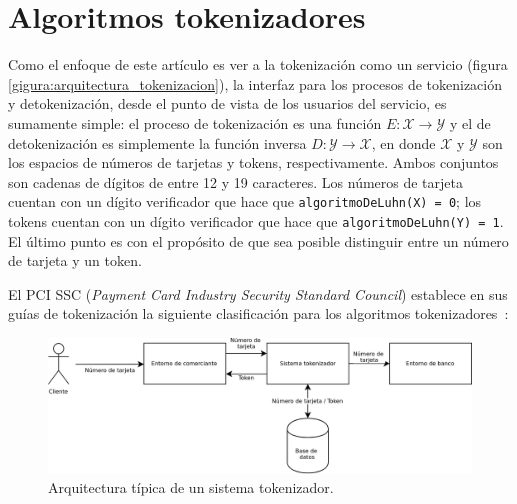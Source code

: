 %
%

\section{Algoritmos tokenizadores}

Como el enfoque de este artículo es ver a la tokenización como un servicio
(figura \ref{gigura:arquitectura_tokenizacion}), la interfaz para los procesos
de tokenización y detokenización, desde el punto de vista de los usuarios del
servicio, es sumamente simple: el proceso de tokenización es una función $ E:
\mathcal{X} \rightarrow \mathcal{Y} $ y el de detokenización es  simplemente la
función inversa $ D: \mathcal{Y} \rightarrow \mathcal{X} $, en donde $
\mathcal{X} $ y $ \mathcal{Y} $ son los espacios de números de tarjetas y
tokens, respectivamente. Ambos conjuntos son cadenas de dígitos de entre 12 y 19
caracteres. Los números de tarjeta cuentan con un dígito verificador que hace
que \texttt{algoritmoDeLuhn(X) = 0}; los tokens cuentan con un dígito
verificador que hace que \texttt{algoritmoDeLuhn(Y) = 1}. El último punto es con
el propósito de que sea posible distinguir entre un número de tarjeta y un token.

El PCI SSC (\textit{Payment Card Industry Security Standard Council}) establece
en sus guías de tokenización la siguiente clasificación para los algoritmos
tokenizadores~\cite{pci_tokens}:

\begin{figure}
  \begin{center}
    \includegraphics[width=1.0\linewidth]{diagramas/sistema_tokenizador.png}
    \caption{Arquitectura típica de un sistema tokenizador.}
    \label{figura:arquitectura_tokenizacion}
  \end{center}
\end{figure}

